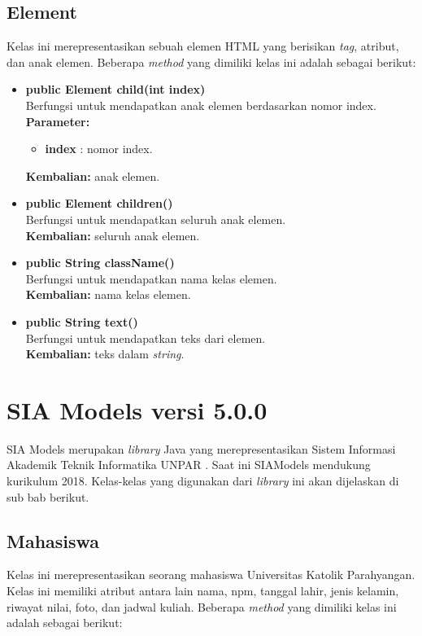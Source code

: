 \subsection{Element}

Kelas ini merepresentasikan sebuah elemen HTML yang berisikan \textit{tag}, atribut, dan anak elemen. Beberapa \textit{method} yang dimiliki kelas ini adalah sebagai berikut:
\begin{itemize}
	\item \textbf{public Element child(int index)} \\
		Berfungsi untuk mendapatkan anak elemen berdasarkan nomor index. \\
		\textbf{Parameter:} 
		\begin{itemize}
			\item \textbf{index} : nomor index.
		\end{itemize}
		\textbf{Kembalian:} anak elemen.	
		
		\item \textbf{public Element children()} \\
		Berfungsi untuk mendapatkan seluruh anak elemen. \\
		\textbf{Kembalian:} seluruh anak elemen.	
		
		\item \textbf{public String className()} \\
		Berfungsi untuk mendapatkan nama kelas elemen. \\
		\textbf{Kembalian:} nama kelas elemen.	
		
		\item \textbf{public String text()} \\
		Berfungsi untuk mendapatkan teks dari elemen. \\
		\textbf{Kembalian:} teks dalam \textit{string}.	
\end{itemize}

\section{SIA Models versi 5.0.0}
SIA Models merupakan \textit{library} Java yang merepresentasikan Sistem Informasi Akademik Teknik Informatika UNPAR \cite{siamodels}. Saat ini SIAModels mendukung kurikulum 2018. Kelas-kelas yang digunakan dari \textit{library} ini akan dijelaskan di sub bab berikut.

\subsection{Mahasiswa}
Kelas ini merepresentasikan seorang mahasiswa Universitas Katolik Parahyangan. Kelas ini memiliki atribut antara lain nama, npm, tanggal lahir, jenis kelamin, riwayat nilai, foto, dan jadwal kuliah. Beberapa \textit{method} yang dimiliki kelas ini adalah sebagai berikut:

